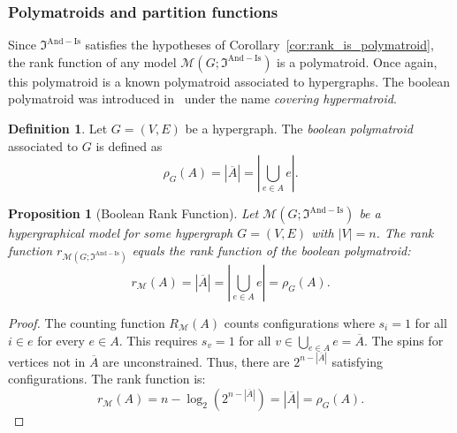 \documentclass[11pt,reqno]{amsart}
\newcommand{\Mo}{\mathcal{M}}
\newcommand{\mca}{\mathfrak{I}^{\mathrm{And-Is}}}
\theoremstyle{plain}
\newtheorem{proposition}[theorem]{Proposition}
\theoremstyle{definition}
\newtheorem{definition}[theorem]{Definition}
\numberwithin{equation}{section}
\begin{document}
\subsubsection{Polymatroids and partition functions}
Since $\mca$ satisfies the hypotheses of Corollary~\ref{cor:rank_is_polymatroid}, the rank function of any model $\Mo(G; \mca)$ is a polymatroid. Once again, this polymatroid is a known polymatroid associated to hypergraphs. The boolean polymatroid was introduced in~\cite{Helg} under the name \emph{covering hypermatroid}.

\begin{definition}
     Let $G=(V,E)$ be a hypergraph. The \emph{boolean polymatroid} associated to $G$ is defined as
     \[
     \rho_G(A) = |\overline{A}| = \left| \bigcup_{e \in A} e \right|.
     \]
\end{definition}

\begin{proposition}[Boolean Rank Function]
\label{prop:and_ising_rank}
    Let $\Mo(G; \mca)$ be a hypergraphical model for some hypergraph $G = (V,E)$ with $|V| = n$. The rank function $r_{\Mo(G; \mca)}$ equals the rank function of the \emph{boolean polymatroid}:
    \[ r_{\Mo}(A) = |\overline{A}| = \left| \bigcup_{e \in A} e \right| = \rho_G(A). \]
\end{proposition}

\begin{proof}
    The counting function $R_{\Mo}(A)$ counts configurations where $s_i=1$ for all $i \in e$ for every $e \in A$. This requires $s_v = 1$ for all $v \in \bigcup_{e \in A} e = \overline{A}$. The spins for vertices not in $\overline{A}$ are unconstrained. 
    Thus, there are $2^{n - |\overline{A}|}$ satisfying configurations.
    The rank function is:
    \[ r_{\Mo}(A) = n - \log_2(2^{n - |\overline{A}|}) = |\overline{A}| = \rho_G(A). \]
\end{proof}
\end{document}
